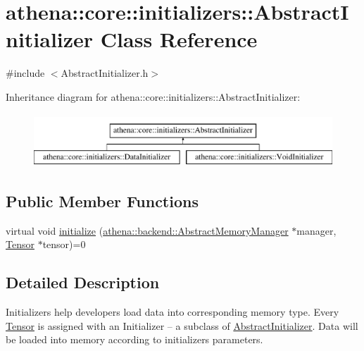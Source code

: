 \hypertarget{classathena_1_1core_1_1initializers_1_1_abstract_initializer}{}\section{athena\+:\+:core\+:\+:initializers\+:\+:Abstract\+Initializer Class Reference}
\label{classathena_1_1core_1_1initializers_1_1_abstract_initializer}


{\ttfamily \#include $<$Abstract\+Initializer.\+h$>$}

Inheritance diagram for athena\+:\+:core\+:\+:initializers\+:\+:Abstract\+Initializer\+:\begin{figure}[H]
\begin{center}
\leavevmode
\includegraphics[height=2.000000cm]{classathena_1_1core_1_1initializers_1_1_abstract_initializer}
\end{center}
\end{figure}
\subsection*{Public Member Functions}
\begin{DoxyCompactItemize}
\item 
virtual void \mbox{\hyperlink{classathena_1_1core_1_1initializers_1_1_abstract_initializer_a9c0f0c57add306c9da8ffe8797532f62}{initialize}} (\mbox{\hyperlink{classathena_1_1backend_1_1_abstract_memory_manager}{athena\+::backend\+::\+Abstract\+Memory\+Manager}} $\ast$manager, \mbox{\hyperlink{classathena_1_1core_1_1_tensor}{Tensor}} $\ast$tensor)=0
\end{DoxyCompactItemize}


\subsection{Detailed Description}
Initializers help developers load data into corresponding memory type. Every \mbox{\hyperlink{classathena_1_1core_1_1_tensor}{Tensor}} is assigned with an Initializer -- a subclass of \mbox{\hyperlink{classathena_1_1core_1_1initializers_1_1_abstract_initializer}{Abstract\+Initializer}}. Data will be loaded into memory according to initializer\textquotesingle{}s parameters. 

